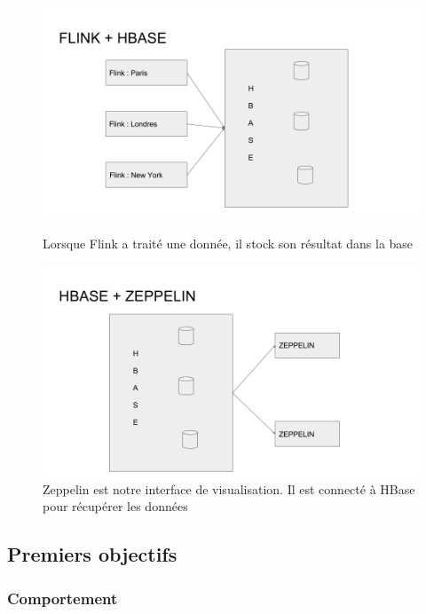 \documentclass[a4paper,oneside,10pt]{article}
\begin{document}
\pagebreak

\begin{figure}[h]
\centering
\includegraphics[width=16cm]{content/FlinkHbase.png}
\caption{Lorsque Flink a traité une donnée, il stock son résultat dans la base}
\label{fig1}
\centering
\includegraphics[width=16cm]{content/HbaseZeppelin.png}
\caption{Zeppelin est notre interface de visualisation. Il est connecté à HBase pour récupérer les données}
\label{fig1}
\end{figure}

\pagebreak

\subsection{Premiers objectifs}


\subsubsection{Comportement}
\end{document}

